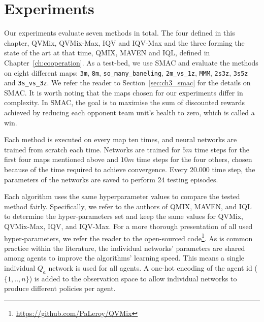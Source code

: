 \section{Experiments} \label{sec:ch4_experiments}

Our experiments evaluate seven methods in total.
The four defined in this chapter, QVMix, QVMix-Max, IQV and IQV-Max and the three forming the state of the art at that time, QMIX, MAVEN and IQL, defined in Chapter~\ref{ch:cooperation}.
As a test-bed, we use SMAC and evaluate the methods on eight different maps: \texttt{3m}, \texttt{8m}, \texttt{so\_many\_baneling}, \texttt{2m\_vs\_1z}, \texttt{MMM}, \texttt{2s3z}, \texttt{3s5z} and \texttt{3s\_vs\_3z}. 
We refer the reader to Section~\ref{sec:ch3_smac} for the details on SMAC.
It is worth noting that the maps chosen for our experiments differ in complexity. 
In SMAC, the goal is to maximise the sum of discounted rewards achieved by reducing each opponent team unit's health to zero, which is called a win.

Each method is executed on every map ten times, and neural networks are trained from scratch each time.
Networks are trained for $5m$ time steps for the first four maps mentioned above and $10m$ time steps for the four others, chosen because of the time required to achieve convergence.
Every $20.000$ time step, the parameters of the networks are saved to perform $24$ testing episodes.

Each algorithm uses the same hyperparameter values to compare the tested method fairly.
Specifically, we refer to the authors of QMIX, MAVEN, and IQL to determine the hyper-parameters set and keep the same values for QVMix, QVMix-Max, IQV, and IQV-Max. 
For a more thorough presentation of all used hyper-parameters, we refer the reader to the open-sourced code\footnote{\url{https://github.com/PaLeroy/QVMix}}.
As is common practice within the literature, the individual networks' parameters are shared among agents to improve the algorithms' learning speed.
This means a single individual $Q_a$ network is used for all agents.
A one-hot encoding of the agent id ($\{1,..,n\}$) is added to the observation space to allow individual networks to produce different policies per agent.

